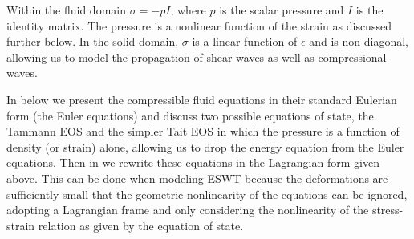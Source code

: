\documentclass{article}
\begin{document}
Within the fluid domain $\sigma = -pI$, where $p$ is the scalar pressure and $I$ is
the identity matrix.  The pressure is a nonlinear function of the strain as discussed further below.
In the solid domain, $\sigma$ is a linear function of $\epsilon$ and is non-diagonal, allowing us to model
the propagation of shear waves as well as compressional waves.

 

In  below we present the compressible fluid equations in their standard Eulerian form (the 
Euler
equations) and discuss two possible equations of state, the Tammann EOS and the simpler Tait EOS in 
which
the pressure is a function of density (or strain) alone, allowing us to drop the energy equation from the
Euler equations.   Then in  we rewrite these equations in the Lagrangian form
given above.  This can be done when modeling ESWT because the deformations are sufficiently small 
that 
the geometric nonlinearity of the equations can be ignored, adopting a Lagrangian frame and only 
considering
the nonlinearity of the stress-strain relation as given by the equation of state.  
\end{document}

